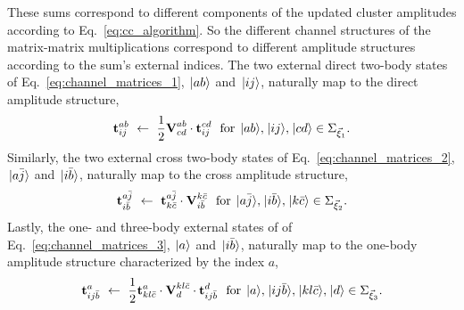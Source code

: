 \documentclass[thesis.tex]{subfiles}
\begin{document}
These sums correspond to different components of the updated cluster amplitudes according to Eq.\ \eqref{eq:cc_algorithm}.  So the different channel structures of the matrix-matrix multiplications correspond to different amplitude structures according to the sum's external indices.  The two external direct two-body states of Eq.\ \eqref{eq:channel_matrices_1}, $\hspace{1pt}\lvert ab \rangle$ and $\hspace{1pt}\lvert ij \rangle$, naturally map to the direct amplitude structure,
\begin{equation} \label{eq:amp_matrices_1}
  \btamp{ab}{ij}\ \leftarrow\ \frac{1}{2}\bvint{ab}{cd}\cdot\btamp{cd}{ij}\ \ \text{for}\ \ket{ab},\ket{ij},\ket{cd} \in \Sigma_{\vec{\xi}_{1}}.
\end{equation}
Similarly, the two external cross two-body states of Eq.\ \eqref{eq:channel_matrices_2}, $\hspace{1pt}\lvert a\bar{j} \rangle$ and $\hspace{1pt}\lvert i\bar{b} \rangle$, naturally map to the cross amplitude structure,
\begin{equation} \label{eq:amp_matrices_2}
  \btamp{a\bar{j}}{i\bar{b}}\ \leftarrow\ \btamp{a\bar{j}}{k\bar{c}}\cdot\bvint{k\bar{c}}{i\bar{b}}\ \ \text{for}\ \ket{a\bar{j}},\ket{i\bar{b}},\ket{k\bar{c}} \in \Sigma_{\vec{\xi}_{2}}.
\end{equation}
Lastly, the one- and three-body external states of of Eq.\ \eqref{eq:channel_matrices_3}, $\hspace{1pt}\lvert a \rangle$ and $\hspace{1pt}\lvert i\bar{b} \rangle$, naturally map to the one-body amplitude structure characterized by the index $a$,
\begin{equation} \label{eq:amp_matrices_3}
  \btamp{a}{ij\bar{b}}\ \leftarrow\ \frac{1}{2}\btamp{a}{kl\bar{c}}\cdot\bvint{kl\bar{c}}{d}\cdot\btamp{d}{ij\bar{b}}\ \ \text{for}\ \ket{a},\ket{ij\bar{b}},\ket{kl\bar{c}},\ket{d} \in \Sigma_{\vec{\xi}_{3}}.
\end{equation}
\end{document}
